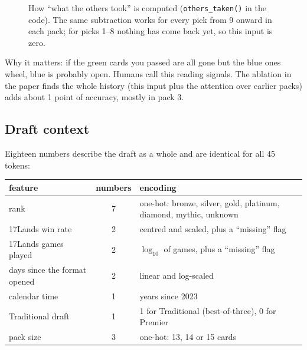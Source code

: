 \documentclass[11pt,letterpaper]{article}
\newcommand{\code}[1]{\texttt{\small #1}}
\begin{document}
\begin{figure}[!htbp]
\centering
{}
\caption{How ``what the others took'' is computed (\code{others\_taken()} in the code). The same
subtraction works for every pick from 9 onward in each pack; for picks 1--8 nothing has come back yet, so
this input is zero.}
\label{fig:others}
\end{figure}

Why it matters: if the green cards you passed are all gone but the blue ones wheel, blue is probably open.
Humans call this reading signals. The ablation in the paper finds the whole history (this input plus the
attention over earlier packs) adds about 1 point of accuracy, mostly in pack 3.

\subsection{Draft context}\label{sec:ctx}

Eighteen numbers describe the draft as a whole and are identical for all 45 tokens:

\begin{center}\small
\begin{tabular}{lcl}
\toprule
feature & numbers & encoding \\
\midrule
rank & 7 & one-hot: bronze, silver, gold, platinum, diamond, mythic, unknown \\
17Lands win rate & 2 & centred and scaled, plus a ``missing'' flag \\
17Lands games played & 2 & $\log_{10}$ of games, plus a ``missing'' flag \\
days since the format opened & 2 & linear and log-scaled \\
calendar time & 1 & years since 2023 \\
Traditional draft & 1 & 1 for Traditional (best-of-three), 0 for Premier \\
pack size & 3 & one-hot: 13, 14 or 15 cards \\
\bottomrule
\end{tabular}
\end{center}
\end{document}
